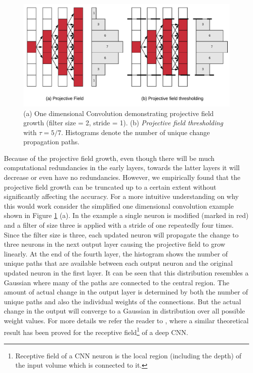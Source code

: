 \begin{figure}[t]
\includegraphics[width=\columnwidth]{images/pf_truncate}
\caption{(a) One dimensional Convolution demonstrating projective field growth (filter size = 2, stride = 1). (b) \textit{Projective field thresholding} with $\tau = 5/7$. Histograms denote the number of unique change propagation paths.}
\label{fig:pf_truncate}
\end{figure}

Because of the projective field growth, even though there will be much computational redundancies in the early layers, towards the latter layers it will decrease or even have no redundancies.
However, we empirically found that the projective field growth can be truncated up to a certain extent without significantly affecting the accuracy.
For a more intuitive understanding on why this would work consider the simplified one dimensional convolution example shown in Figure \ref{fig:pf_truncate} (a). In the example a single neuron is modified (marked in red) and a filter of size three is applied with a stride of one repeatedly four times.
Since the filter size is three, each updated neuron will propagate the change to three neurons in the next output layer causing the projective field to grow linearly.
At the end of the fourth layer, the histogram shows the number of unique paths that are available between each output neuron and the original updated neuron in the first layer.
It can be seen that this distribution resembles a Gaussian where many of the paths are connected to the central region.
The amount of actual change in the output layer is determined by both the number of unique paths and also the individual weights of the connections.
But the actual change in the output will converge to a Gaussian in distribution over all possible weight values.
For more details we refer the reader to \cite{luo2016understanding}, where a similar theoretical result has been proved for the receptive field\footnote{Receptive field of a CNN neuron is the local region (including the depth) of the input volume which is connected to it.} of a deep CNN.


